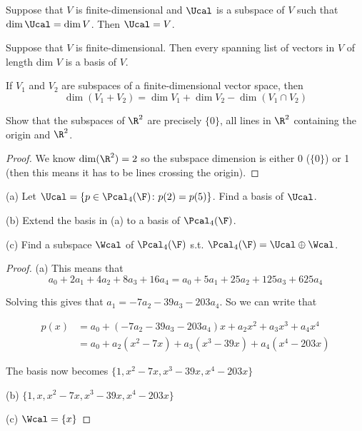 \documentclass{extarticle}
\begin{document}
\begin{corollary}
    Suppose that \(V\) is finite-dimensional and \(\Ucal\) is a subspace of \(V\) such that 
    \(\dim \Ucal = \dim V\). Then \(\Ucal = V\).
\end{corollary}

\begin{corollary}
    Suppose that \(V\) is finite-dimensional. Then every spanning list of vectors in \(V\)
    of length dim \(V\) is a basis of \(V\). 
\end{corollary}

\begin{thm}
    If \(V_1\) and \(V_2\) are subspaces of a finite-dimensional vector space, then 
    \[\dim(V_1 + V_2) = \dim V_1 + \dim V_ 2 - \dim (V_1 \cap V_2)\]
\end{thm}

\newpage 
{}

\begin{problem}{1}
    Show that the subspaces of \(\R^2\) are precisely \(\{0\}\), all lines in \(\R^2\)
    containing the origin and \(\R^2\).
\end{problem}

\begin{proof}
We know \(\dim (\R^2) = 2\) so the subspace dimension is either 0 (\(\{0\}\)) or 
1 (then this means it has to be lines crossing the origin). 
\end{proof}

\begin{problem}{5}
    (a) Let \(\Ucal = \{p \in \Pcal_4 (\F) \colon p(2) = p(5)\}\). Find a basis of \(\Ucal\).

    (b) Extend the basis in (a) to a basis of \(\Pcal_4 (\F)\). 

    (c) Find a subspace \(\Wcal\) of \(\Pcal_4 (\F)\) s.t. \(\Pcal_4(\F) = \Ucal \oplus \Wcal\).
\end{problem}

\begin{proof}
(a)  This means that 
\[a_0 + 2a_1 + 4a_2 + 8a_3 + 16a_4 = a_0 + 5a_1 + 25a_2 + 125 a_3 + 625a_4\]

Solving this gives that \(a_1 = -7a_2 - 39a_3 - 203 a_4\). So we can write that 

\begin{align*}
    p(x)
    &= a_0 + (-7a_2 - 39a_3 - 203 a_4)x + a_2 x^2 + a_3 x^3 + a_4 x^4 \\ 
    &= a_0 + a_2(x^2 - 7x) + a_3(x^3 - 39x) + a_4 (x^4 - 203x)
\end{align*}

The basis now becomes \(\{1, x^2 - 7x, x^3 - 39x, x^4 - 203x\}\)

(b) \(\{1, x, x^2 - 7x, x^3 - 39x, x^4 - 203x\}\)

(c) \(\Wcal = \{x\}\)
\end{proof}
\end{document}
